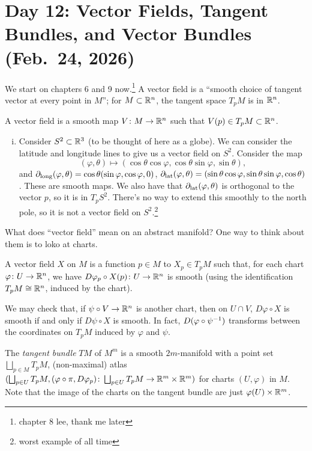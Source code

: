 \section{Day 12: Vector Fields, Tangent Bundles, and Vector Bundles (Feb.\ 24, 2026)}
We start on chapters 6 and 9 now.\footnote{chapter 8 lee, thank me later} A vector field is a ``smooth choice of tangent vector at every point in $M$''; for $M \subset \mathbb R^n$, the tangent space $T_p M$ is in $\mathbb R^n$. 
\begin{definition}
    A vector field is a smooth map $V \colon M \to \mathbb R^n$ such that $V(p) \in T_p M \subset \mathbb R^n$.
\end{definition}
\begin{enumerate}[(i)]
    \item Consider $S^2 \subset \mathbb R^3$ (to be thought of here as a globe). We can consider the latitude and longitude lines to give us a vector field on $S^2$. Consider the map
    \[ (\varphi, \theta) \mapsto (\cos \theta \cos \varphi, \cos \theta \sin \varphi, \sin \theta), \]
    and $\partial_{\operatorname{long}}(\varphi, \theta) = \cos \theta (\sin \varphi, \cos \varphi, 0)$, $\partial_{\operatorname{lat}}(\varphi, \theta) = (\sin \theta \cos \varphi, \sin \theta \sin \varphi, \cos \theta)$. These are smooth maps. We also have that $\partial_{\operatorname{lat}}(\varphi, \theta)$ is orthogonal to the vector $p$, so it is in $T_p S^2$. There's no way to extend this smoothly to the north pole, so it is not a vector field on $S^2$.\footnote{worst example of all time}
\end{enumerate}
What does ``vector field'' mean on an abstract manifold? One way to think about them is to loko at charts.
\begin{definition}
    A vector field $X$ on $M$ is a function $p \in M$ to $X_p \in T_p M$ such that, for each chart $\varphi \colon U \to \mathbb R^n$, we have $D \varphi_p \circ X(p) \colon U \to \mathbb R^n$ is smooth (using the identification $T_p M \cong \mathbb R^n$, induced by the chart).
\end{definition}
We may check that, if $\psi \circ V \to \mathbb R^n$ is another chart, then on $U \cap V$, $D \varphi \circ X$ is smooth if and only if $D \psi \circ X$ is smooth. In fact, $D(\varphi \circ \psi^{-1})$ transforms between the coordinates on $T_p M$ induced by $\varphi$ and $\psi$.
\begin{definition}
    The \textit{tangent bundle} $TM$ of $M^m$ is a smooth $2m$-manifold with a point set $\bigsqcup_{p \in M} T_p M$, (non-maximal) atlas $(\bigsqcup_{p \in U} T_p M, (\varphi \circ \pi, D \varphi_p) \colon \bigsqcup_{p \in U} T_p M \to \mathbb R^m \times \mathbb R^m)$ for charts $(U, \varphi)$ in $M$. Note that the image of the charts on the tangent bundle are just $\varphi(U) \times \mathbb R^m$.
\end{definition}

